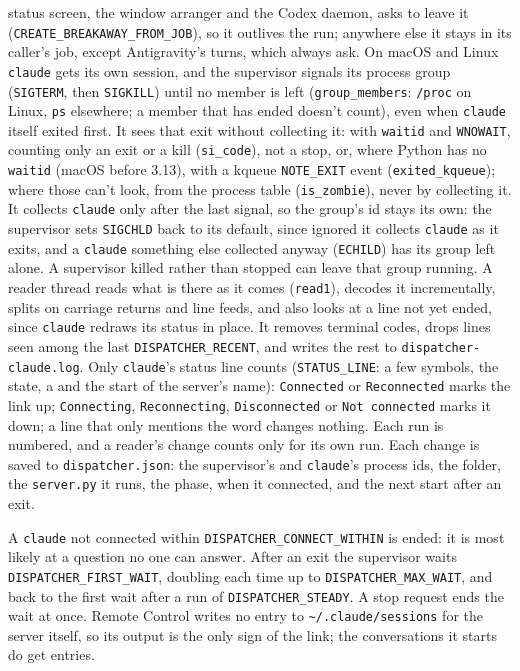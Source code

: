 \documentclass[10pt,a4paper]{article}
\newcommand{\code}[1]{\texttt{#1}}
\begin{document}
status screen, the window arranger and the Codex daemon, asks to leave it
(\code{CREATE\_BREAKAWAY\_FROM\_JOB}), so it outlives the run; anywhere else it stays in its
caller's job, except Antigravity's turns, which always ask. On macOS and Linux \code{claude}
gets its own session, and the supervisor signals its process group (\code{SIGTERM}, then
\code{SIGKILL}) until no member is left (\code{group\_members}: \code{/proc} on Linux, \code{ps}
elsewhere; a member that has ended doesn't count), even when \code{claude} itself exited first. It
sees that exit without collecting it: with \code{waitid} and \code{WNOWAIT}, counting only an exit
or a kill (\code{si\_code}), not a stop, or, where Python has no \code{waitid} (macOS before
3.13), with a kqueue \code{NOTE\_EXIT} event (\code{exited\_kqueue}); where those can't look,
from the process table (\code{is\_zombie}), never by collecting it. It collects \code{claude} only after the
last signal, so the group's id stays its own: the supervisor sets \code{SIGCHLD} back to its
default, since ignored it collects \code{claude} as it exits, and a \code{claude} something else
collected anyway (\code{ECHILD}) has its group left alone. A supervisor killed rather than
stopped can leave that group running. A reader thread reads what is there as it comes (\code{read1}),
decodes it incrementally, splits on carriage returns and line feeds, and also looks at a line not
yet ended, since \code{claude} redraws its status in place. It removes terminal codes, drops lines
seen among the last \code{DISPATCHER\_RECENT}, and writes the rest to \code{dispatcher-claude.log}.
Only \code{claude}'s status line counts (\code{STATUS\_LINE}: a few symbols, the state, a
\textperiodcentered{} and the start of the server's name): \code{Connected} or \code{Reconnected}
marks the link up; \code{Connecting}, \code{Reconnecting}, \code{Disconnected} or
\code{Not connected} marks it down; a line that only mentions the word changes nothing. Each run is numbered, and a
reader's change counts only for its own run. Each change is saved to
\code{dispatcher.json}: the supervisor's and \code{claude}'s process ids, the folder, the
\code{server.py} it runs, the phase, when it connected, and
the next start after an exit.

A \code{claude} not connected within \code{DISPATCHER\_CONNECT\_WITHIN} is ended: it is most
likely at a question no one can answer. After an exit the supervisor waits
\code{DISPATCHER\_FIRST\_WAIT}, doubling each time up to \code{DISPATCHER\_MAX\_WAIT}, and back
to the first wait after a run of \code{DISPATCHER\_STEADY}. A stop request ends the wait at once.
Remote Control writes no entry to \code{\textasciitilde/.claude/sessions} for the server itself,
so its output is the only sign of the link; the conversations it starts do get entries.
\end{document}
